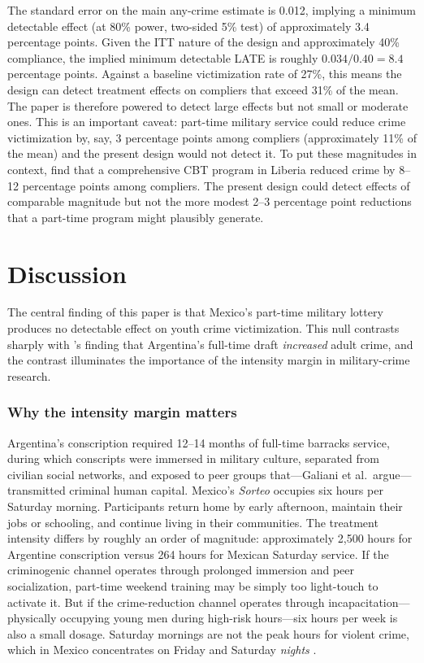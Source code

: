 \documentclass[12pt]{article}
\begin{document}
The standard error on the main any-crime estimate is 0.012, implying a minimum detectable effect (at 80\% power, two-sided 5\% test) of approximately 3.4 percentage points. Given the ITT nature of the design and approximately 40\% compliance, the implied minimum detectable LATE is roughly $0.034 / 0.40 = 8.4$ percentage points. Against a baseline victimization rate of 27\%, this means the design can detect treatment effects on compliers that exceed 31\% of the mean. The paper is therefore powered to detect large effects but not small or moderate ones. This is an important caveat: part-time military service could reduce crime victimization by, say, 3 percentage points among compliers (approximately 11\% of the mean) and the present design would not detect it. To put these magnitudes in context, \citet{blattman2017reducing} find that a comprehensive CBT program in Liberia reduced crime by 8--12 percentage points among compliers. The present design could detect effects of comparable magnitude but not the more modest 2--3 percentage point reductions that a part-time program might plausibly generate.


\section{Discussion}
\label{sec:discussion}

The central finding of this paper is that Mexico's part-time military lottery produces no detectable effect on youth crime victimization. This null contrasts sharply with \citet{galiani2011conscription}'s finding that Argentina's full-time draft \textit{increased} adult crime, and the contrast illuminates the importance of the intensity margin in military-crime research.

\subsubsection*{Why the intensity margin matters} Argentina's conscription required 12--14 months of full-time barracks service, during which conscripts were immersed in military culture, separated from civilian social networks, and exposed to peer groups that---Galiani et al.\ argue---transmitted criminal human capital. Mexico's \textit{Sorteo} occupies six hours per Saturday morning. Participants return home by early afternoon, maintain their jobs or schooling, and continue living in their communities. The treatment intensity differs by roughly an order of magnitude: approximately 2,500 hours for Argentine conscription versus 264 hours for Mexican Saturday service. If the criminogenic channel operates through prolonged immersion and peer socialization, part-time weekend training may be simply too light-touch to activate it. But if the crime-reduction channel operates through incapacitation---physically occupying young men during high-risk hours---six hours per week is also a small dosage. Saturday mornings are not the peak hours for violent crime, which in Mexico concentrates on Friday and Saturday \textit{nights} \citep{sesnsp2024incidencia}.
\end{document}
